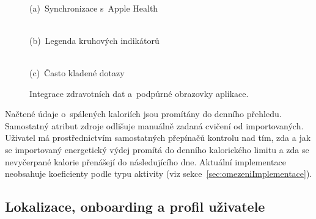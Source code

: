 \begin{figure}[!htb]
	\centering
	\begin{minipage}[t]{0.31\textwidth}
		\centering
		\\(a)~Synchronizace s~Apple Health
	\end{minipage}\hfill
	\begin{minipage}[t]{0.31\textwidth}
		\centering
		\\(b)~Legenda kruhových indikátorů
	\end{minipage}\hfill
	\begin{minipage}[t]{0.31\textwidth}
		\centering
		\\(c)~Často kladené dotazy
	\end{minipage}
	\caption{Integrace zdravotních dat a~podpůrné obrazovky aplikace.}
	\label{fig:screenHealthIntegration}
\end{figure}

Načtené údaje o~spálených kaloriích jsou promítány do denního přehledu.
Samostatný atribut zdroje odlišuje manuálně zadaná cvičení od importovaných.
Uživatel má prostřednictvím samostatných přepínačů kontrolu nad tím, zda a jak se importovaný energetický výdej promítá do denního kalorického limitu a zda se nevyčerpané kalorie přenášejí do následujícího dne.
Aktuální implementace neobsahuje koeficienty podle typu aktivity (viz sekce~\ref{sec:omezeniImplementace}).

\subsection{Lokalizace, onboarding a profil uživatele}
\label{subsec:lokalizaceOnboarding}

